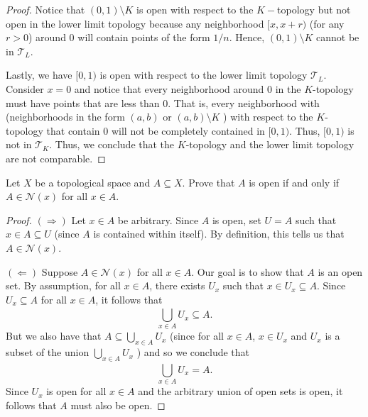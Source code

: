\documentclass[a4paper]{article}
\begin{document}
\begin{problem}
\begin{enumerate}
\begin{proof}
                 Notice that \( (0,1) \setminus  K  \) is open with respect to the \( K- \)topology but not open in the lower limit topology because any neighborhood \( [x,x+r) \) (for any \( r > 0 \)) around \( 0  \) will contain points of the form \( 1/n \). Hence, \( (0,1) \setminus  K   \) cannot be in \( {\mathcal{T}}_{L} \).
                
                 Lastly, we have \( [0,1) \) is open with respect to the lower limit topology \( {\mathcal{T}}_{L} \). Consider \( x = 0  \) and notice that every neighborhood around \( 0  \) in the \( K \)-topology must have points that are less than \( 0  \). That is, every neighborhood with (neighborhoods in the form \( (a,b)   \) or \( (a,b) \setminus  K  \) ) with respect to the \( K \)-topology that contain \( 0  \) will not be completely contained in \( [0,1) \). Thus, \( [0,1) \) is not in \( \mathcal{T}_K \).  
                 Thus, we conclude that the \( K \)-topology and the lower limit topology are not comparable.

             \end{proof}
   \end{enumerate}
\end{problem}

\begin{problem}
   Let \( X  \) be a topological space and \( A \subseteq X  \). Prove that \( A  \) is open if and only if \( A \in \mathcal{N}(x) \) for all \( x \in A  \). 
\end{problem}
\begin{proof}
\( (\Longrightarrow) \) Let \( x \in A  \) be arbitrary. Since \( A  \) is open, set \( U = A  \) such that \( x \in A \subseteq U \) (since \( A  \) is contained within itself). By definition, this tells us that \( A \in \mathcal{N}(x) \). 

\( (\Longleftarrow) \) Suppose \( A \in \mathcal{N}(x) \) for all \( x \in A  \). Our goal is to show that \( A  \) is an open set. By assumption, for all \( x \in A  \), there exists \( {U}_{x}  \) such that \( x \in {U}_{x} \subseteq A  \). Since \( {U}_{x} \subseteq A   \) for all \( x \in A  \), it follows that  
\[  \bigcup_{ x \in A  }^{  }  {U}_{x} \subseteq A.  \]
But we also have that \( A \subseteq  \bigcup_{ x \in A  }^{  }  {U}_{x}  \) (since for all \( x \in A  \), \( x \in {U}_{x} \) and \( {U}_{x} \) is a subset of the union \( \bigcup_{ x \in A  }^{  }  {U}_{x} \) ) and so we conclude that  
\[  \bigcup_{ x \in A  }^{  }  {U}_{x} = A. \]
Since \( {U}_{x} \) is open for all \( x \in A  \) and the arbitrary union of open sets is open, it follows that \( A  \) must also be open. 
\end{proof}
\end{document}
